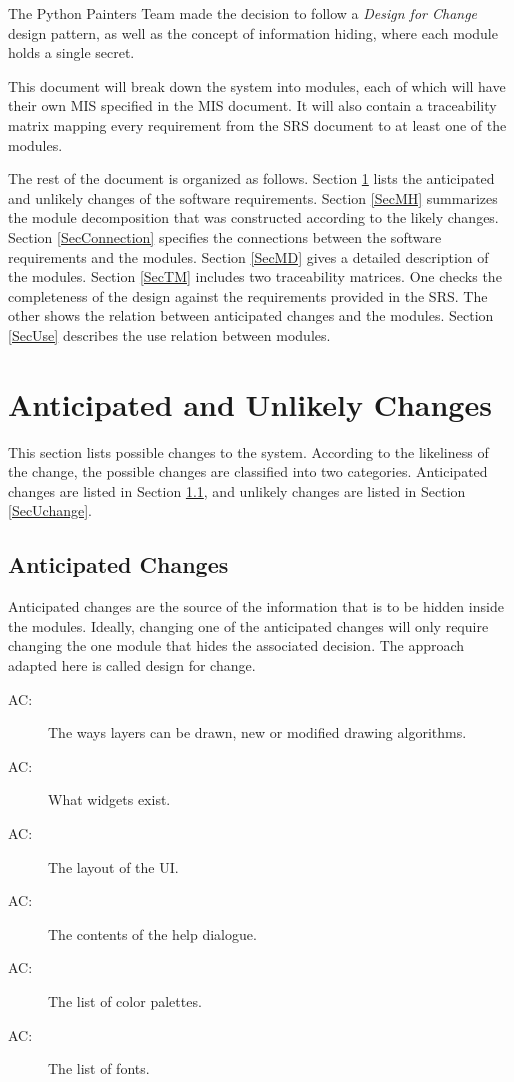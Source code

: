 \documentclass[12pt, titlepage]{article}
\newcounter{acnum}
\newcommand{\actheacnum}{AC\theacnum}
\begin{document}
The Python Painters Team made the decision to follow a \emph{Design for Change} design pattern, as well as the concept of information hiding, where each module holds a single secret.

This document will break down the system into modules, each of which will have their own MIS specified in the MIS document. It will also contain a traceability matrix mapping every requirement from the SRS document to at least one of the modules.

The rest of the document is organized as follows. Section
\ref{SecChange} lists the anticipated and unlikely changes of the software
requirements. Section \ref{SecMH} summarizes the module decomposition that
was constructed according to the likely changes. Section \ref{SecConnection}
specifies the connections between the software requirements and the
modules. Section \ref{SecMD} gives a detailed description of the
modules. Section \ref{SecTM} includes two traceability matrices. One checks
the completeness of the design against the requirements provided in the SRS. The
other shows the relation between anticipated changes and the modules. Section
\ref{SecUse} describes the use relation between modules.

\section{Anticipated and Unlikely Changes} \label{SecChange}

This section lists possible changes to the system. According to the likeliness
of the change, the possible changes are classified into two
categories. Anticipated changes are listed in Section \ref{SecAchange}, and
unlikely changes are listed in Section \ref{SecUchange}.

\subsection{Anticipated Changes} \label{SecAchange}

Anticipated changes are the source of the information that is to be hidden
inside the modules. Ideally, changing one of the anticipated changes will only
require changing the one module that hides the associated decision. The approach
adapted here is called design for
change.

\begin{description}
\item[ \actheacnum \label{acLayerDraw}:] The ways layers can be drawn, new or modified drawing algorithms.
\item[ \actheacnum \label{acWidget}:] What widgets exist.
\item[ \actheacnum \label{acUILayout}:] The layout of the UI.
\item[ \actheacnum \label{acHelp}:] The contents of the help dialogue.
\item[ \actheacnum \label{acPalettes}:] The list of color palettes.
\color{red}
\item[ \actheacnum \label{acFonts}:] The list of fonts.\color{black}
\end{description}
\end{document}
